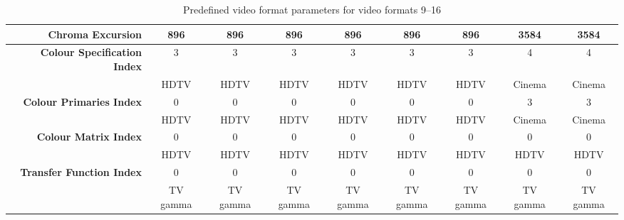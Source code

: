 \begin{sidewaystable}[!ht]
\begin{tabular}{|r|c|c|c|c|c|c|c|c|}
{\bf Chroma Excursion} &896 &896 &896 &896 &896 &896 &3584 & 3584\\
\hline
{\bf Colour Specification Index} &3 & 3 & 3& 3&	3&3 & 4& 4\\
&HDTV&HDTV&HDTV&HDTV&HDTV&HDTV&Cinema&Cinema\\
\hline
{\bf Colour Primaries Index} &0&	0&0&0&0&0&3&3\\
&HDTV&HDTV&HDTV&HDTV&HDTV&HDTV&Cinema&Cinema\\
\hline
{\bf Colour Matrix Index} &0&0&0&0&0&0&0&0\\
&HDTV&HDTV&HDTV&HDTV&HDTV&HDTV&HDTV&HDTV\\
\hline
{\bf Transfer Function Index} &0&0&0&0&0&0&0&0\\
&TV gamma&TV gamma&TV gamma&TV gamma&TV gamma&TV gamma&TV gamma&TV gamma\\
\hline
\end{tabular}
\caption{Predefined video format parameters for video formats 9--16}
\end{sidewaystable}



